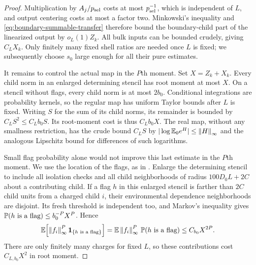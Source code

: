\begin{proof}
Multiplication by $A_j/p_{\rm sel}$ costs at most $p_{\rm sel}^{-1}$, which is independent
of $L$, and output centering costs at most a factor two.  Minkowski's
inequality and \eqref{eq:boundary-summable-transfer} therefore bound
the boundary-child part of the linearized output by $o_L(1)Z_k$.
All bulk inputs can be bounded crudely, giving $C_LX_k$.
Only finitely many fixed shell ratios are needed once $L$ is fixed;
we subsequently choose $s_0$ large enough for all their pure estimates.

It remains to control the actual map in the $P$th moment.  Set
$X=Z_k+X_k$.  Every child norm in an enlarged determining stencil has
root moment at most $X$.  On a stencil without flags, every child norm
is at most $2b_0$.  Conditional integrations are probability kernels,
so the regular map has uniform Taylor bounds after $L$ is fixed.
Writing $S$ for the sum of its child norms, its remainder is bounded
by $C_LS^2\le C_Lb_0S$.  Its root-moment cost is thus $C_Lb_0X$.
The real map, without any smallness restriction, has the crude bound
$C_LS$ by $|\log\E_0e^H|\le\norm{H}_\infty$ and the analogous
Lipschitz bound for differences of such logarithms.

Small flag probability alone would not improve this last estimate in
the $P$th moment.  We use the location of the flags, as in
\cite[Section~``The contribution of isolated large terms'']{Q}.
Enlarge the determining stencil to include all isolation checks and
all child neighborhoods of radius $100D_0L+2C$ about a contributing
child.  If a flag $h$ in this enlarged stencil is farther than $2C$
child units from a charged child $i$, their environmental dependence
neighborhoods are disjoint.  Its fresh threshold is independent too,
and Markov's inequality gives
$\P(h\text{ is a flag})\le b_0^{-P}X^P$.  Hence
\begin{equation}\label{eq:boundary-independent-flag}
 \E\!\left[\norm{f_i}_\infty^P
                    {\bf1}_{\{h\text{ is a flag}\}}\right]
 =\E\norm{f_i}_\infty^P\,
       \P(h\text{ is a flag})
 \le C_{b_0}X^{2P}.
\end{equation}
There are only finitely many charges for fixed $L$, so these
contributions cost $C_{L,b_0}X^2$ in root moment.


\end{proof}
